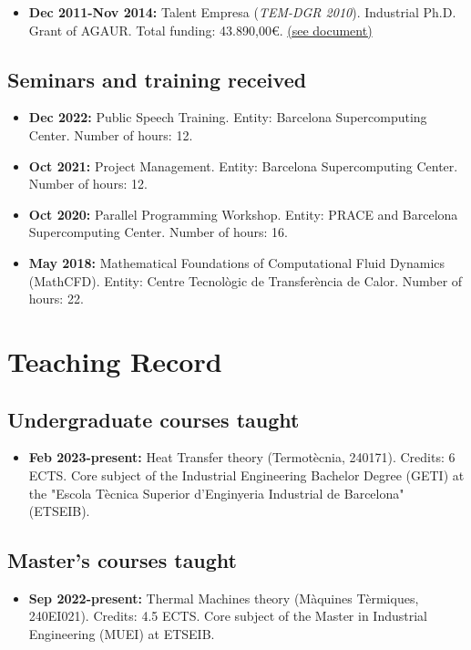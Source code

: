 \documentclass{article}
\begin{document}
\begin{itemize}
\item {\bf Dec 2011-Nov 2014:} Talent Empresa ({\it TEM-DGR 2010}). Industrial Ph.D. Grant of AGAUR. Total funding: 43.890,00€. \hyperlink{agaur.1}{(see document)}
\end{itemize}

\subsection{Seminars and training received}

\begin{itemize}
\item {\bf Dec 2022:} Public Speech Training. Entity: Barcelona Supercomputing Center. Number of hours: 12. 
\item {\bf Oct 2021:} Project Management. Entity: Barcelona Supercomputing Center. Number of hours: 12. 
\item {\bf Oct 2020:} Parallel Programming Workshop. Entity: PRACE and Barcelona Supercomputing Center. Number of hours: 16. 
\item {\bf May 2018:} Mathematical Foundations of Computational Fluid Dynamics (MathCFD). Entity: Centre Tecnològic de Transferència de Calor. Number of hours: 22. 
\end{itemize}

\newpage

\section{Teaching Record}
\subsection{Undergraduate courses taught}
\begin{itemize}
\item {\bf Feb 2023-present:} Heat Transfer theory (Termotècnia, 240171). Credits: 6 ECTS. Core subject of the Industrial Engineering Bachelor Degree (GETI) at the "Escola Tècnica Superior d’Enginyeria Industrial de Barcelona" (ETSEIB). 
\end{itemize}

\subsection{Master's courses taught}
\begin{itemize}
\item {\bf Sep 2022-present:} Thermal Machines theory (Màquines Tèrmiques, 240EI021). Credits: 4.5 ECTS. Core subject of the Master in Industrial Engineering (MUEI) at ETSEIB.
\end{itemize}
\end{document}
